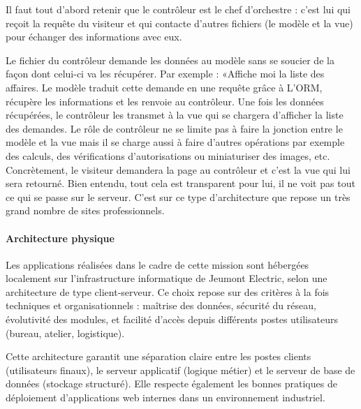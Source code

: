 \documentclass[11pt,a4paper]{article}
\begin{document}
Il faut tout d'abord retenir que le contrôleur est le chef d'orchestre : c'est lui qui reçoit la requête du visiteur et qui contacte d'autres fichiers (le modèle et la vue) pour échanger des informations avec eux.

Le fichier du contrôleur demande les données au modèle sans se soucier de la façon dont celui-ci va les récupérer. Par exemple : «Affiche moi la liste des affaires. Le modèle traduit cette demande en une requête grâce à L'ORM, récupère les informations et les renvoie au contrôleur.
Une fois les données récupérées, le contrôleur les transmet à la vue qui se chargera d'afficher la liste des demandes. Le rôle de contrôleur ne se limite pas à faire la jonction entre le modèle et la vue mais il se charge aussi à faire d'autres opérations par exemple des calculs, des vérifications
d'autorisations ou miniaturiser des images, etc.
Concrètement, le visiteur demandera la page au contrôleur et c'est la vue qui lui sera retourné. Bien entendu, tout cela est transparent pour lui, il ne voit pas tout ce qui se passe sur le serveur. C'est sur ce type d'architecture que repose un très grand nombre de sites professionnels.

\paragraph{Architecture physique} 

Les applications réalisées dans le cadre de cette mission sont hébergées localement sur l’infrastructure informatique de Jeumont Electric, selon une architecture de type client-serveur. Ce choix repose sur des critères à la fois techniques et organisationnels : maîtrise des données, sécurité du réseau, évolutivité des modules, et facilité d’accès depuis différents postes utilisateurs (bureau, atelier, logistique).

Cette architecture garantit une séparation claire entre les postes clients (utilisateurs finaux), le serveur applicatif (logique métier) et le serveur de base de données (stockage structuré). Elle respecte également les bonnes pratiques de déploiement d’applications web internes dans un environnement industriel.
\end{document}
